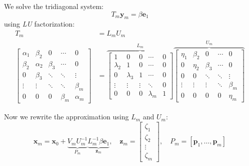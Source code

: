 We solve the tridiagonal system:
\[
    T_m \mathbf{y}_m = \beta \mathbf{e}_1
\]
using \emph{LU} factorization:
\begin{align*}
    T_m                                                   & = L_m U_m \\
    \begin{bmatrix}
        \alpha_1 & \beta_2  & 0       & \cdots  & 0        \\
        \beta_2  & \alpha_2 & \beta_3 & \cdots  & 0        \\
        0        & \beta_3  & \ddots  & \ddots  & \vdots   \\
        \vdots   & \vdots   & \ddots  & \ddots  & \beta_m  \\
        0        & 0        & 0       & \beta_m & \alpha_m
    \end{bmatrix} & =
    \overbrace{
        \begin{bmatrix}
            1         & 0         & 0      & \cdots    & 0 \\
            \lambda_2 & 1         & 0      & \cdots    & 0 \\
            0         & \lambda_3 & 1      & \cdots    & 0 \\
            \vdots    & \vdots    & \vdots & \ddots    & 0 \\
            0         & 0         & 0      & \lambda_m & 1
        \end{bmatrix}
    }^{L_m}
    \overbrace{
        \begin{bmatrix}
            \eta_1 & \beta_2 & 0       & \cdots & 0       \\
            0      & \eta_2  & \beta_3 & \cdots & 0       \\
            0      & 0       & \ddots  & \ddots & \vdots  \\
            \vdots & \vdots  & \vdots  & \ddots & \beta_m \\
            0      & 0       & 0       & 0      & \eta_m
        \end{bmatrix}}^{U_m}
\end{align*}

Now we rewrite the approximation using $L_m$ and $U_m$:
\[
    \mathbf{x}_m = \mathbf{x}_0 + \underbrace{V_m U_m^{-1}}_{P_m} \underbrace{L_m^{-1} \beta \mathbf{e}_1}_{\mathbf{z}_m},
    \quad \mathbf{z}_m =
    \begin{bmatrix}
        \zeta_1 \\
        \zeta_2 \\
        \vdots  \\
        \zeta_m
    \end{bmatrix},
    \quad P_m = [\mathbf{p}_1, \ldots, \mathbf{p}_m]
\]


